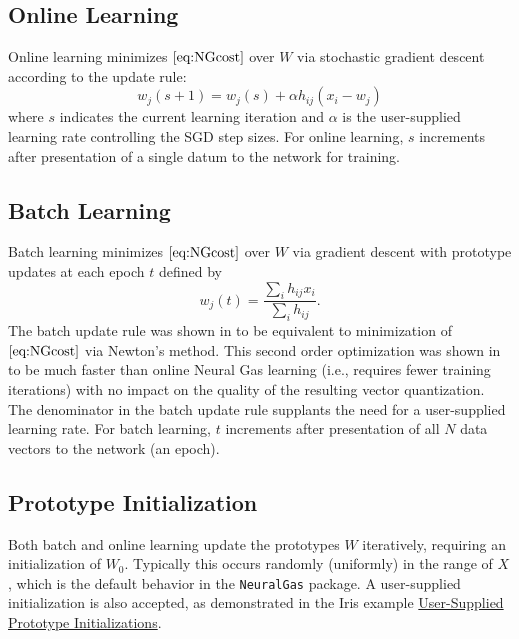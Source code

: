 \documentclass[11pt,]{article}
\begin{document}
\hypertarget{online-learning}{%
\subsection{Online Learning}\label{online-learning}}

Online learning minimizes \(\eqref{eq:NGcost}\) over \(W\) via
stochastic gradient descent according to the update rule:
\[ w_j(s+1) = w_j(s) + \alpha  h_{ij}  (x_i - w_j)\] where \(s\)
indicates the current learning iteration and \(\alpha\) is the
user-supplied learning rate controlling the SGD step sizes. For online
learning, \(s\) increments after presentation of a single datum to the
network for training.

\hypertarget{batch-learning}{%
\subsection{Batch Learning}\label{batch-learning}}

Batch learning minimizes \(\eqref{eq:NGcost}\) over \(W\) via gradient
descent with prototype updates at each epoch \(t\) defined by
\[ w_j(t) = \frac{\sum\limits_i h_{ij} x_i}{\sum\limits_i h_{ij}}.\] The
batch update rule was shown in \autocite{cottrell2006} to be equivalent
to minimization of \(\eqref{eq:NGcost}\) via Newton's method. This
second order optimization was shown in \autocite{cottrell2006} to be
much faster than online Neural Gas learning (i.e., requires fewer
training iterations) with no impact on the quality of the resulting
vector quantization. The denominator in the batch update rule supplants
the need for a user-supplied learning rate. For batch learning, \(t\)
increments after presentation of all \(N\) data vectors to the network
(an epoch).

\hypertarget{prototype-initialization}{%
\subsection{Prototype Initialization}\label{prototype-initialization}}

Both batch and online learning update the prototypes \(W\) iteratively,
requiring an initialization of \(W_0\). Typically this occurs randomly
(uniformly) in the range of \(X\), which is the default behavior in the
\texttt{NeuralGas} package. A user-supplied initialization is also
accepted, as demonstrated in the Iris example
\protect\hyperlink{user-supplied-prototype-initializations}{User-Supplied
Prototype Initializations}.
\end{document}
